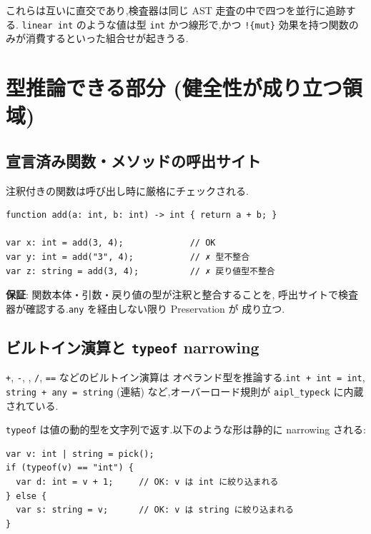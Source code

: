 \documentclass[11pt,a4paper]{article}
\newcommand{\code}[1]{\texttt{\small #1}}
\begin{document}
これらは互いに直交であり,検査器は同じ AST 走査の中で四つを並行に追跡する.
\code{linear int} のような値は型 \code{int} かつ線形で,かつ \code{!\{mut\}}
効果を持つ関数のみが消費するといった組合せが起きうる.

\section{型推論できる部分 (健全性が成り立つ領域)}
\label{sec:sound}

\subsection{宣言済み関数・メソッドの呼出サイト}

注釈付きの関数は呼び出し時に厳格にチェックされる.

\begin{lstlisting}
function add(a: int, b: int) -> int { return a + b; }

var x: int = add(3, 4);             // OK
var y: int = add("3", 4);           // ✗ 型不整合
var z: string = add(3, 4);          // ✗ 戻り値型不整合
\end{lstlisting}

\textbf{保証}: 関数本体・引数・戻り値の型が注釈と整合することを,
呼出サイトで検査器が確認する.\code{any} を経由しない限り Preservation が
成り立つ.

\subsection{ビルトイン演算と \code{typeof} narrowing}

\code{+}, \code{-}, \code{*}, \code{/}, \code{==} などのビルトイン演算は
オペランド型を推論する.\code{int + int = int}, \code{string + any = string}
(連結) など,オーバーロード規則が \code{aipl\_typeck} に内蔵されている.

\code{typeof} は値の動的型を文字列で返す.以下のような形は静的に
narrowing される:

\begin{lstlisting}
var v: int | string = pick();
if (typeof(v) == "int") {
  var d: int = v + 1;     // OK: v は int に絞り込まれる
} else {
  var s: string = v;      // OK: v は string に絞り込まれる
}
\end{lstlisting}
\end{document}
